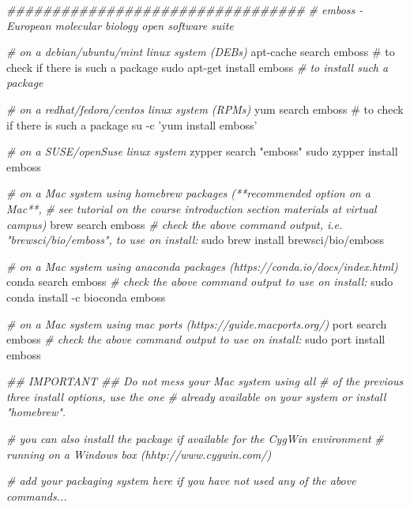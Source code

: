 \documentclass[10pt,a4paper,]{article}
\newenvironment{Shaded}{}{}
\newcommand{\CommentTok}[1]{\textcolor[rgb]{0.38,0.63,0.69}{\textit{#1}}}
\newcommand{\ExtensionTok}[1]{#1}
\newcommand{\FunctionTok}[1]{\textcolor[rgb]{0.02,0.16,0.49}{#1}}
\newcommand{\NormalTok}[1]{#1}
\newcommand{\StringTok}[1]{\textcolor[rgb]{0.25,0.44,0.63}{#1}}
\begin{document}
\begin{Shaded}
\begin{Highlighting}[]
\CommentTok{#################################}
\CommentTok{# emboss - European molecular biology open software suite}

\CommentTok{# on a debian/ubuntu/mint linux system (DEBs)}
\ExtensionTok{apt-cache}\NormalTok{ search emboss     # to check if there is such a package}
\FunctionTok{sudo}\NormalTok{ apt-get install emboss }\CommentTok{# to install such a package}

\CommentTok{# on a redhat/fedora/centos linux system (RPMs)}
\ExtensionTok{yum}\NormalTok{ search emboss           # to check if there is such a package}
\FunctionTok{su}\NormalTok{ -c }\StringTok{'yum install emboss'}

\CommentTok{# on a SUSE/openSuse  linux system}
\ExtensionTok{zypper}\NormalTok{ search }\StringTok{"emboss"}
\FunctionTok{sudo}\NormalTok{ zypper install emboss}

\CommentTok{# on a Mac system using homebrew packages (**recommended option on a Mac**,}
\CommentTok{# see tutorial on the course introduction section materials at virtual campus)}
\ExtensionTok{brew}\NormalTok{ search emboss}
\CommentTok{# check the above command output, i.e. "brewsci/bio/emboss", to use on install:}
\FunctionTok{sudo}\NormalTok{ brew install brewsci/bio/emboss}

\CommentTok{# on a Mac system using anaconda packages (https://conda.io/docs/index.html)}
\ExtensionTok{conda}\NormalTok{ search emboss}
\CommentTok{# check the above command output to use on install:}
\FunctionTok{sudo}\NormalTok{ conda install -c bioconda emboss}

\CommentTok{# on a Mac system using mac ports (https://guide.macports.org/)}
\ExtensionTok{port}\NormalTok{ search emboss}
\CommentTok{# check the above command output to use on install:}
\FunctionTok{sudo}\NormalTok{ port install emboss}

\CommentTok{## IMPORTANT ## Do not mess your Mac system using all}
\CommentTok{#               of the previous three install options, use the one}
\CommentTok{#               already available on your system or install "homebrew".}

\CommentTok{# you can also install the package if available for the CygWin environment}
\CommentTok{# running on a Windows box (hhtp://www.cygwin.com/)}

\CommentTok{# add your packaging system here if you have not used any of the above commands...}
\end{Highlighting}
\end{Shaded}
\end{document}
